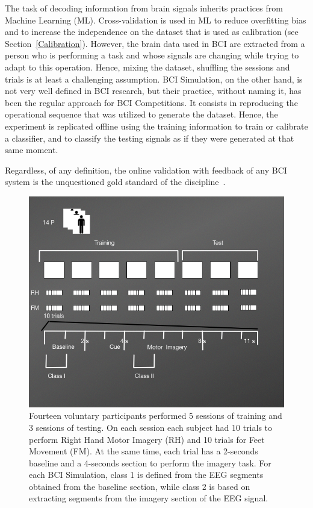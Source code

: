 \begin{story}
The task of decoding information from brain signals inherits practices from Machine Learning (ML).  Cross-validation is used in ML to reduce overfitting bias and to increase the independence on the dataset that is used as calibration (see Section~\ref{Calibration}).  However, the brain data used in BCI are extracted from a person who is performing a task and whose signals are changing while trying to adapt to this operation.  Hence, mixing the dataset, shuffling the sessions and trials is at least a challenging assumption.  BCI Simulation, on the other hand, is not very well defined in BCI research, but their practice, without naming it, has been the regular approach for BCI Competitions. It consists in reproducing the operational sequence that was utilized to generate the dataset. Hence, the experiment is replicated offline using the training information to train or calibrate a classifier, and to classify the testing signals as if they were generated at that same moment.

Regardless, of any definition, the online validation with feedback of any BCI system is the unquestioned gold standard of the discipline~\cite{WolpawJonathanR2012}.
\end{story}


\begin{figure}[]
\centering
\includegraphics[scale=0.6]{images/DatasetIIIDiagram2.png}
\caption[Motor Imagery Experimental Protocol]{Fourteen voluntary participants performed 5 sessions of training and 3 sessions of testing.  On each session each subject had 10 trials to perform Right Hand Motor Imagery (RH) and 10 trials for Feet Movement (FM).  At the same time, each trial has a 2-seconds baseline and a 4-seconds section to perform the imagery task.  For each BCI Simulation, class 1 is defined from the EEG segments obtained from the baseline section, while class 2 is based on extracting segments from the imagery section of the EEG signal.}
\label{fig:midatasetdiagram}
\end{figure}


